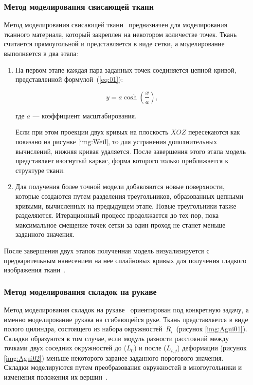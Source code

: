 \subsubsection{Метод моделирования свисающей ткани}
Метод моделирования свисающей ткани~\cite{bib08} предназначен для моделирования
тканного материала, который закреплен на некотором количестве точек. Ткань
считается прямоугольной и представляется в виде сетки, а моделирование
выполняется в два этапа:
\begin{enumerate}[label=\arabic*)]
    \item На первом этапе каждая пара заданных точек соединяется цепной кривой,
        представленной формулой~(\ref{eq:01}):

        \begin{equation}\label{eq:01}
            y = a\cosh(\frac{x}{a}),
        \end{equation}

        где $a$ --- коэффициент масштабирования.

        Если при этом проекции двух кривых на плоскость $XOZ$ пересекаются как
        показано на рисунке \ref{img:Weil}, то для устранения дополнительных
        вычислений, нижняя кривая удаляется. После завершения этого этапа
        модель представляет изогнутый каркас, форма которого только приближается
        к структуре ткани. 


    \item Для получения более точной модели добавляются новые поверхности,
        которые создаются путем разделения треугольников, образованных цепными
        кривыми, вычисленных на предыдущем этапе.  Новые треугольники также
        разделяются. Итерационный процесс продолжается до тех пор, пока
        максимальное смещение точек сетки за один проход не станет меньше
        заданного значения.
\end{enumerate}

После завершения двух этапов полученная модель визуализируется с
предварительным нанесением на нее сплайновых кривых для получения
гладкого изображения ткани~\cite{bib07, bib08}.

\subsubsection{Метод моделирования складок на рукаве}

Метод моделирования складок на рукаве~\cite{bib07} ориентирован под конкретную
задачу, а именно моделирование рукава на сгибающейся руке.  Ткань представляется
в виде полого цилиндра, состоящего из набора окружностей~$R_i$~(рисунок
\ref{img:Agui01}). Складки образуются в том случае, если модуль разности
расстояний между точками двух соседних окружностей до ($L_0$) и после
($L_{i,j}$) деформации (рисунок \ref{img:Agui02})
меньше некоторого заранее заданного порогового значения. Складки моделируются
путем преобразования окружностей в многоугольники и изменения положения их
вершин~\cite{bib07}.

